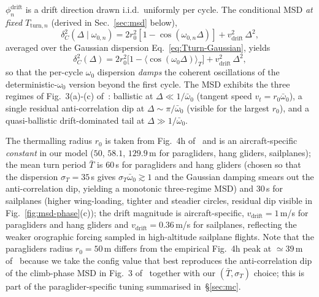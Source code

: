 \documentclass[11pt,a4paper]{article}
\begin{document}
\begin{description}
\begin{description}
$\phi_n^{\mathrm{drift}}$ is a drift direction drawn i.i.d.\
uniformly per cycle. The conditional MSD \emph{at fixed}
$T_{\mathrm{turn},n}$ (derived in Sec.~\ref{sec:msd} below),
\begin{equation}
\delta^2_C(\Delta \mid \omega_{0,n}) = 2 r_0^2 [1 - \cos(\omega_{0,n}\Delta)]
                   + v_{\mathrm{drift}}^2\,\Delta^2,
\label{eq:msd-climb-analytic}
\end{equation}
averaged over the Gaussian dispersion Eq.~\eqref{eq:Tturn-Gaussian},
yields
\begin{equation}
\delta^2_C(\Delta) = 2 r_0^2 \bigl[1 - \langle\cos(\omega_{0}\Delta)\rangle_T\bigr]
                   + v_{\mathrm{drift}}^2\,\Delta^2,
\label{eq:msd-climb-avg}
\end{equation}
so that the per-cycle $\omega_0$ dispersion \emph{damps} the
coherent oscillations of the deterministic-$\omega_0$ version
beyond the first cycle. The MSD exhibits the three regimes of
Fig.~3(a)-(c) of~\cite{vilpellet2026}: ballistic at
$\Delta \ll 1/\bar{\omega}_0$ (tangent speed
$v_t = r_0 \bar{\omega}_0$), a single residual anti-correlation
dip at $\Delta \sim \pi/\bar{\omega}_0$ (visible for the largest
$r_0$), and a quasi-ballistic drift-dominated tail at
$\Delta \gg 1/\bar{\omega}_0$.
\end{description}
The thermalling radius $r_0$ is taken from Fig.~4h
of~\cite{vilpellet2026} and is an aircraft-specific
\emph{constant} in our model ($50$, $58.1$, $129.9$\,m for paragliders,
hang gliders, sailplanes); the mean turn period $\bar{T}$ is
$60$\,s for paragliders and hang gliders (chosen so that the
dispersion $\sigma_T = 35$\,s gives
$\sigma_T \bar{\omega}_0 \gtrsim 1$ and the Gaussian damping
smears out the anti-correlation dip, yielding a monotonic
three-regime MSD) and $30$\,s for sailplanes (higher wing-loading,
tighter and steadier circles, residual dip visible in
Fig.~\ref{fig:msd-phase}(c)); the drift magnitude is
aircraft-specific, $v_{\mathrm{drift}} = 1$\,m/s for paragliders
and hang gliders and $v_{\mathrm{drift}} = 0.36$\,m/s for sailplanes,
reflecting the weaker orographic forcing sampled in high-altitude
sailplane flights. Note that the paragliders radius $r_0=50$\,m
differs from the empirical Fig.~4h peak at $\simeq 39$\,m
of~\cite{vilpellet2026} because we take the config value that
best reproduces the anti-correlation dip of the climb-phase MSD in
Fig.~3 of~\cite{vilpellet2026} together with our
$(\bar{T},\sigma_T)$ choice; this is part of the
paraglider-specific tuning summarised in~\S\ref{sec:mc}.


\end{description}
\end{document}
